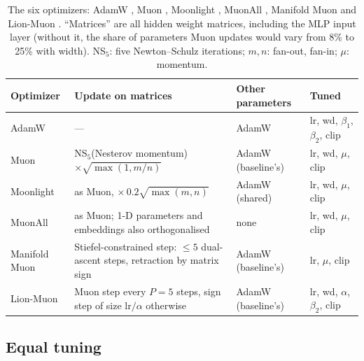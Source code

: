 \begin{table}[t]
\caption{The six optimizers: AdamW \citep{loshchilov2019adamw}, Muon \citep{jordan2024muon},
Moonlight \citep{liu2025moonlight}, MuonAll \citep{page2025muonall}, Manifold Muon
\citep{bernstein2025manifolds} and Lion-Muon \citep{lionmuon2026}. ``Matrices'' are all hidden
weight matrices, including the MLP input layer (without it, the share of parameters Muon
updates would vary from 8\% to 25\% with width). NS$_5$: five Newton--Schulz
iterations; $m,n$: fan-out, fan-in; $\mu$: momentum.}
\label{tab:optimizers}
\centering\small
\begin{tabular}{@{}l>{\raggedright\arraybackslash}p{5.5cm}>{\raggedright\arraybackslash}p{2.7cm}l@{}}
\toprule
Optimizer & Update on matrices & Other parameters & Tuned \\
\midrule
AdamW & --- & AdamW & lr, wd, $\beta_1$, $\beta_2$, clip \\
Muon & NS$_5$(Nesterov momentum) $\times\sqrt{\max(1,m/n)}$ & AdamW (baseline's) & lr, wd, $\mu$, clip \\
Moonlight & as Muon, $\times\,0.2\sqrt{\max(m,n)}$ & AdamW (shared) & lr, wd, $\mu$, clip \\
MuonAll & as Muon; 1-D parameters and embeddings also orthogonalised & none & lr, wd, $\mu$, clip \\
Manifold Muon & Stiefel-constrained step: $\le 5$ dual-ascent steps, retraction by matrix sign & AdamW (baseline's) & lr, $\mu$, clip \\
Lion-Muon & Muon step every $P{=}5$ steps, sign step of size lr$/\alpha$ otherwise & AdamW (baseline's) & lr, wd, $\alpha$, $\beta_2$, clip \\
\bottomrule
\end{tabular}
\end{table}

\subsection{Equal tuning}

